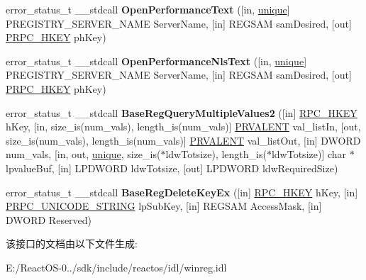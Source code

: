 \begin{DoxyCompactItemize}
\item 
\mbox{\label{interfacewinreg_ad9b31a76f8fc06de2fd51a7498b5f1fa}} 
error\+\_\+status\+\_\+t \+\_\+\+\_\+stdcall {\bfseries Open\+Performance\+Text} (\mbox{[}in, \hyperlink{interfaceunique}{unique}\mbox{]} P\+R\+E\+G\+I\+S\+T\+R\+Y\+\_\+\+S\+E\+R\+V\+E\+R\+\_\+\+N\+A\+ME Server\+Name, \mbox{[}in\mbox{]} R\+E\+G\+S\+AM sam\+Desired, \mbox{[}out\mbox{]} \hyperlink{interfacevoid}{P\+R\+P\+C\+\_\+\+H\+K\+EY} ph\+Key)
\item 
\mbox{\label{interfacewinreg_a8772783a55142a93041c7729103f35ce}} 
error\+\_\+status\+\_\+t \+\_\+\+\_\+stdcall {\bfseries Open\+Performance\+Nls\+Text} (\mbox{[}in, \hyperlink{interfaceunique}{unique}\mbox{]} P\+R\+E\+G\+I\+S\+T\+R\+Y\+\_\+\+S\+E\+R\+V\+E\+R\+\_\+\+N\+A\+ME Server\+Name, \mbox{[}in\mbox{]} R\+E\+G\+S\+AM sam\+Desired, \mbox{[}out\mbox{]} \hyperlink{interfacevoid}{P\+R\+P\+C\+\_\+\+H\+K\+EY} ph\+Key)
\item 
\mbox{\label{interfacewinreg_a11d5e4f4c95bfb6833144f0e2220d3e4}} 
error\+\_\+status\+\_\+t \+\_\+\+\_\+stdcall {\bfseries Base\+Reg\+Query\+Multiple\+Values2} (\mbox{[}in\mbox{]} \hyperlink{interfacevoid}{R\+P\+C\+\_\+\+H\+K\+EY} h\+Key, \mbox{[}in, size\+\_\+is(num\+\_\+vals), length\+\_\+is(num\+\_\+vals)\mbox{]} \hyperlink{structvalue__ent}{P\+R\+V\+A\+L\+E\+NT} val\+\_\+list\+In, \mbox{[}out, size\+\_\+is(num\+\_\+vals), length\+\_\+is(num\+\_\+vals)\mbox{]} \hyperlink{structvalue__ent}{P\+R\+V\+A\+L\+E\+NT} val\+\_\+list\+Out, \mbox{[}in\mbox{]} D\+W\+O\+RD num\+\_\+vals, \mbox{[}in, out, \hyperlink{interfaceunique}{unique}, size\+\_\+is($\ast$ldw\+Totsize), length\+\_\+is($\ast$ldw\+Totsize)\mbox{]} char $\ast$lpvalue\+Buf, \mbox{[}in\mbox{]} L\+P\+D\+W\+O\+RD ldw\+Totsize, \mbox{[}out\mbox{]} L\+P\+D\+W\+O\+RD ldw\+Required\+Size)
\item 
\mbox{\label{interfacewinreg_a2fe84de6dd20cb29a6ca21be8d25f40e}} 
error\+\_\+status\+\_\+t \+\_\+\+\_\+stdcall {\bfseries Base\+Reg\+Delete\+Key\+Ex} (\mbox{[}in\mbox{]} \hyperlink{interfacevoid}{R\+P\+C\+\_\+\+H\+K\+EY} h\+Key, \mbox{[}in\mbox{]} \hyperlink{struct___r_p_c___u_n_i_c_o_d_e___s_t_r_i_n_g}{P\+R\+P\+C\+\_\+\+U\+N\+I\+C\+O\+D\+E\+\_\+\+S\+T\+R\+I\+NG} lp\+Sub\+Key, \mbox{[}in\mbox{]} R\+E\+G\+S\+AM Access\+Mask, \mbox{[}in\mbox{]} D\+W\+O\+RD Reserved)
\end{DoxyCompactItemize}


该接口的文档由以下文件生成\+:\begin{DoxyCompactItemize}
\item 
E\+:/\+React\+O\+S-\/0../sdk/include/reactos/idl/winreg.\+idl\end{DoxyCompactItemize}
